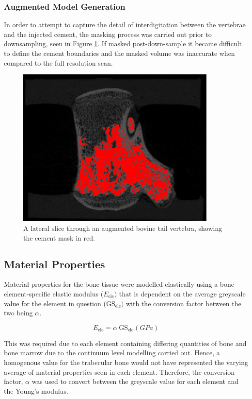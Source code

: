 \subsubsection{Augmented Model Generation}

In order to attempt to capture the detail of interdigitation between the
vertebrae and the injected cement, the masking process was carried out prior to downsampling, seen in Figure \ref{fig:fullressVPseg}. If masked post-down-sample it became difficult to define the cement boundaries and the masked volume was inaccurate when compared to the full resolution scan.


\begin{figure}[hbt]
\centering

  \includegraphics[width=10cm]{images/fullres_VP_segment.png}
  \caption{A lateral slice through an augmented bovine tail vertebra, showing
the cement mask in red.}
\label{fig:fullressVPseg}
\end{figure}


\subsection{Material Properties}\label{material-properties-bov}

Material properties for the bone tissue were modelled elastically using a
bone element-specific elastic modulus (\(E_{\text{ele}})\) that is
dependent on the average greyscale value for the element in question
(\(\text{GS}_{\text{ele}})\) with the conversion factor between the two being $\alpha$.

\[E_{\text{ele}} = \alpha\ \text{GS}_{\text{ele}} (GPa)\]

This was required due to each element containing differing quantities of bone and bone marrow due to the continuum level modelling carried out. Hence, a homogenous value for the trabecular bone would not have represented the varying average of material properties seen in each element. Therefore, the conversion factor, $\alpha$ was used to convert between the greyscale value for each element and the Young's modulus.

